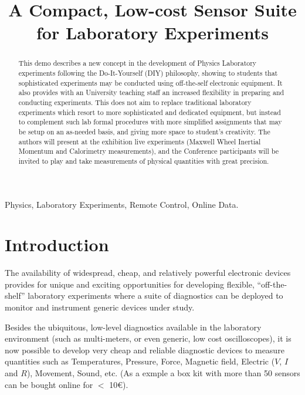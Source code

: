 \documentclass[conference]{IEEEtran}
\begin{document}
\title{A Compact, Low-cost Sensor Suite  for Laboratory Experiments
}

\author{}
\maketitle

\begin{abstract}
This demo describes a new concept in the development of Physics Laboratory experiments 
 following  the Do-It-Yourself (DIY) philosophy, showing to students that sophisticated experiments may be conducted using off-the-self electronic equipment.
It also provides with an University teaching staff an increased flexibility in preparing and conducting experiments. 
This does not aim to replace traditional laboratory experiments which resort to more sophisticated and dedicated equipment,
but instead to complement such lab formal procedures with more simplified assignments that may be setup on an as-needed basis, 
and giving more space to student's creativity.
The authors will present at the exhibition live experiments (Maxwell Wheel Inertial Momentum and Calorimetry measurements), and the Conference 
participants will be invited to play 
and take measurements of physical quantities with great precision.

\end{abstract}

\begin{IEEEkeywords}
Physics, Laboratory Experiments, Remote Control, Online Data.
\end{IEEEkeywords}

\section{Introduction}
The availability of widespread, cheap, and relatively powerful electronic devices provides for unique and exciting opportunities for developing flexible, 
``off-the-shelf'' laboratory experiments where a suite of diagnostics can be deployed to monitor and instrument generic devices under study.

Besides the ubiquitous, low-level diagnostics available in the laboratory environment (such as multi-meters, or even generic, low cost oscilloscopes), 
it is now possible to develop very cheap and reliable diagnostic devices to measure quantities such as  
Temperatures, Pressure, Force, Magnetic field, Electric ($V$, $I$ and $R$), Movement, Sound, etc. 
(As a exmple a box kit with more than 50 sensors can be bought online for $<$ 10€).
\end{document}
